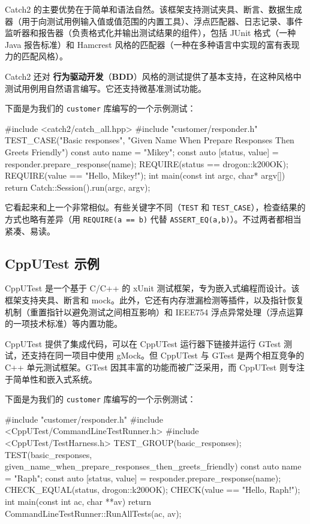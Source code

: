 \label{idx:818}
\label{idx:819}
\label{idx:820}
Catch2 的主要优势在于简单和语法自然。该框架支持测试夹具、断言、数据生成器（用于向测试用例输入值或值范围的内置工具）、浮点匹配器、日志记录、事件监听器和报告器（负责格式化并输出测试结果的组件），包括 JUnit 格式（一种 Java 报告标准）和 Hamcrest 风格的匹配器（一种在多种语言中实现的富有表现力的匹配风格）。

\label{idx:821}
Catch2 还对 \textbf{行为驱动开发}（\textbf{BDD}）风格的测试提供了基本支持，在这种风格中测试用例用自然语言编写。它还支持微基准测试功能。

下面是为我们的 \texttt{customer} 库编写的一个示例测试：

\begin{codebox}[cpp]
#include <catch2/catch_all.hpp>
#include "customer/responder.h"
TEST_CASE("Basic responses",
          "Given Name When Prepare Responses Then Greets Friendly") {
  const auto name = "Mikey";
  const auto [status, value] = responder{}.prepare_response(name);
  REQUIRE(status == drogon::k200OK);
  REQUIRE(value == "Hello, Mikey!");
}
int main(const int argc, char* argv[]) {
  return Catch::Session().run(argc, argv);
}
\end{codebox}

它看起来和上一个非常相似。有些关键字不同（\texttt{TEST} 和 \texttt{TEST\_\allowbreak{}CASE}），检查结果的方式也略有差异（用 \texttt{REQUIRE(\allowbreak{}a =\allowbreak{}=\allowbreak{} b)\allowbreak{}} 代替 \texttt{ASSERT\_\allowbreak{}EQ(\allowbreak{}a,\allowbreak{}b)\allowbreak{}}）。不过两者都相当紧凑、易读。

\subsection{CppUTest 示例}

\label{idx:822}
\label{idx:823}
CppUTest 是一个基于 C/C++ 的 xUnit 测试框架，专为嵌入式编程而设计。该框架支持夹具、断言和 mock。此外，它还有内存泄漏检测等插件，以及指针恢复机制（重置指针以避免测试之间相互影响）和 IEEE754 浮点异常处理（浮点运算的一项技术标准）等内置功能。

\label{idx:824}
\label{idx:825}
CppUTest 提供了集成代码，可以在 CppUTest 运行器下链接并运行 GTest 测试，还支持在同一项目中使用 gMock。但 CppUTest 与 GTest 是两个相互竞争的 C++ 单元测试框架。GTest 因其丰富的功能而被广泛采用，而 CppUTest 则专注于简单性和嵌入式系统。

下面是为我们的 \texttt{customer} 库编写的一个示例测试：

\begin{codebox}[cpp]
#include "customer/responder.h"
#include <CppUTest/CommandLineTestRunner.h>
#include <CppUTest/TestHarness.h>
TEST_GROUP(basic_responses){};
TEST(basic_responses, given_name_when_prepare_responses_then_greets_friendly) {
  const auto name = "Raph";
  const auto [status, value] = responder{}.prepare_response(name);
  CHECK_EQUAL(status, drogon::k200OK);
  CHECK(value == "Hello, Raph!");
}
int main(const int ac, char **av) {
  return CommandLineTestRunner::RunAllTests(ac, av);
}
\end{codebox}

